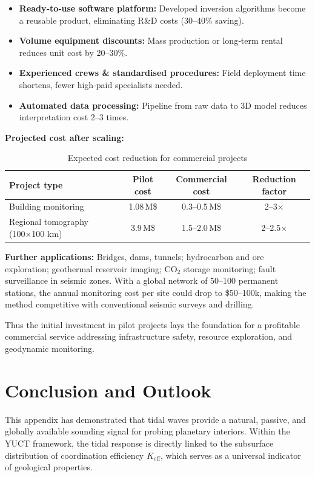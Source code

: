 \documentclass[12pt,a4paper]{article}
\theoremstyle{remark}
\newcommand{\Keff}{K_{\mathrm{eff}}}
\begin{document}
	\begin{itemize}
		\item \textbf{Ready‑to‑use software platform:} Developed inversion algorithms become a reusable product, eliminating R\&D costs (30–40\% saving).
		\item \textbf{Volume equipment discounts:} Mass production or long‑term rental reduces unit cost by 20–30\%.
		\item \textbf{Experienced crews \& standardised procedures:} Field deployment time shortens, fewer high‑paid specialists needed.
		\item \textbf{Automated data processing:} Pipeline from raw data to 3D model reduces interpretation cost 2–3 times.
	\end{itemize}
	
	\textbf{Projected cost after scaling:}
	
	\begin{table}[htbp]
		\centering
		\caption{Expected cost reduction for commercial projects}
		\label{tab:scaling}
		\begin{tabular}{lccc}
			\toprule
			\textbf{Project type} & \textbf{Pilot cost} & \textbf{Commercial cost} & \textbf{Reduction factor} \\
			\midrule
			Building monitoring & 1.08\,M\$ & 0.3–0.5\,M\$ & 2–3× \\
			Regional tomography (100×100 km) & 3.9\,M\$ & 1.5–2.0\,M\$ & 2–2.5× \\
			\bottomrule
		\end{tabular}
	\end{table}
	
	\textbf{Further applications:} Bridges, dams, tunnels; hydrocarbon and ore exploration; geothermal reservoir imaging; CO$_2$ storage monitoring; fault surveillance in seismic zones. With a global network of 50–100 permanent stations, the annual monitoring cost per site could drop to \$50–100k, making the method competitive with conventional seismic surveys and drilling.
	
	Thus the initial investment in pilot projects lays the foundation for a profitable commercial service addressing infrastructure safety, resource exploration, and geodynamic monitoring.
	
	\section{Conclusion and Outlook}
	\label{sec:conclusion}
	
	This appendix has demonstrated that tidal waves provide a natural, passive, and globally available sounding signal for probing planetary interiors. Within the YUCT framework, the tidal response is directly linked to the subsurface distribution of coordination efficiency $\Keff$, which serves as a universal indicator of geological properties.
	
\end{document}
